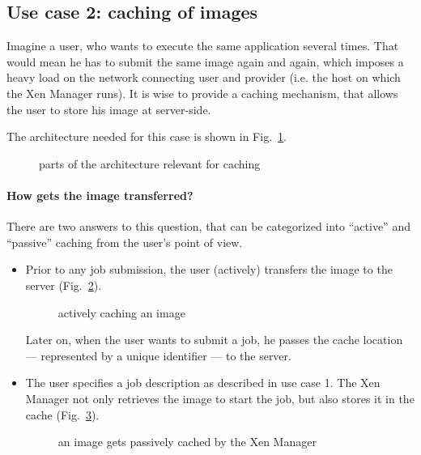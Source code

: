 \subsection{Use case 2: caching of images}
\label{uc:2}

Imagine a user,  who wants to execute the same  application several times. 
That would  mean he has  to submit the  same image again and  again, which
imposes a heavy load on the network connecting user and provider (i.e. the
host  on which the  Xen Manager  runs). It  is wise  to provide  a caching
mechanism, that allows the user to store his image at server-side.

The    architecture    needed    for     this    case    is    shown    in
Fig.~\ref{fig:arch-uc-caching}.

\begin{figure}[htbp]
  \begin{center}
  \end{center}
  \caption[Architecture UC 2]{parts of the architecture relevant for caching}
  \label{fig:arch-uc-caching}
\end{figure}

\paragraph{How gets the image transferred?} There are two answers to this
question, that can be  categorized into ``active'' and ``passive'' caching
from the user's point of view.
\begin{itemize}
\item Prior to any job submission, the user (actively) transfers the image
  to the server  (Fig.~\ref{fig:seq-image-caching-1}).
  \begin{figure}[htbp]
    \begin{center}
    \end{center}
    \caption[Image caching sequence 1]{actively caching an image}
    \label{fig:seq-image-caching-1}
  \end{figure}
  Later  on, when the  user wants  to submit  a job,  he passes  the cache
  location --- represented by a unique identifier --- to the server.
  
\item The user specifies a job description as described in use case 1. The
  Xen Manager  not only  retrieves the  image to start  the job,  but also
  stores it in the cache (Fig.~\ref{fig:seq-image-caching-2}).
  \begin{figure}[htbp]
    \begin{center}
    \end{center}
    \caption[Image caching sequence 2]{an image gets passively cached by
      the Xen Manager}
    \label{fig:seq-image-caching-2}
  \end{figure}
\end{itemize}


